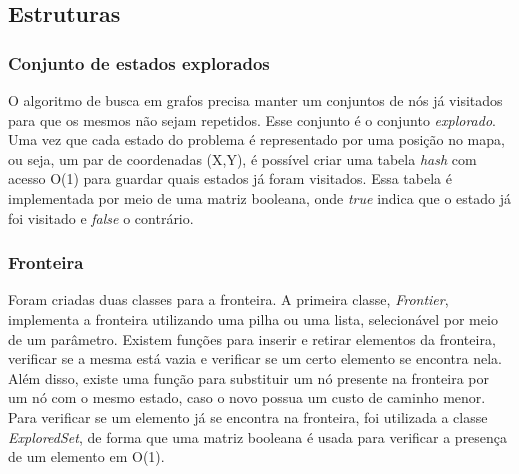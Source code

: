 \subsection{Estruturas}
\subsubsection{Conjunto de estados explorados}
O algoritmo de busca em grafos precisa manter um conjuntos de nós já visitados para que os mesmos não sejam repetidos. Esse conjunto é o conjunto \textit{explorado}. Uma vez que cada estado do problema é representado por uma posição no mapa, ou seja, um par de coordenadas (X,Y), é possível criar uma tabela \textit{hash} com acesso O(1) para guardar quais estados já foram visitados. Essa tabela é implementada por meio de uma matriz booleana, onde \textit{true} indica que o estado já foi visitado e \textit{false} o contrário.



\subsubsection{Fronteira}
Foram criadas duas classes para a fronteira. A primeira classe, \textit{Frontier}, implementa a fronteira utilizando uma pilha ou uma lista, selecionável por meio de um parâmetro. Existem funções para inserir e retirar elementos da fronteira, verificar se a mesma está vazia e verificar se um certo elemento se encontra nela. Além disso, existe uma função para substituir um nó presente na fronteira por um nó com o mesmo estado, caso o novo possua um custo de caminho menor. Para verificar se um elemento já se encontra na fronteira, foi utilizada a classe \textit{ExploredSet}, de forma que uma matriz booleana é usada para verificar a presença de um elemento em O(1).

